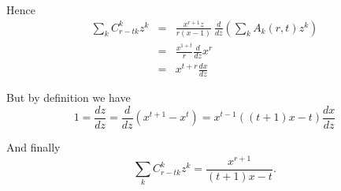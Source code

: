 \documentclass[a4paper,12pt]{article}
\begin{document}
Hence
\begin{eqnarray*}
  \sum_k C_{r-tk}^k z^k &=& \frac{x^{r+1}z}{r(x-1)}\ \frac{d}{dz}
  \left( \sum_k A_k(r,t) z^k\right) \\
  &=& \frac{x^{1+t}}{r} \frac{d}{dz} x^r \\
  &=& x^{t+r} \frac{dx}{dz}
\end{eqnarray*}

But by definition we have
\[  1 = \frac{dz}{dz} = \frac{d}{dz}(x^{t+1}-x^t) = x^{t-1}((t+1)x - t)
\frac{dx}{dz} \]

And finally
\[ \sum_k C_{r-tk}^k z^k = \frac{x^{r+1}}{(t+1)x - t} .\]
\end{document}
